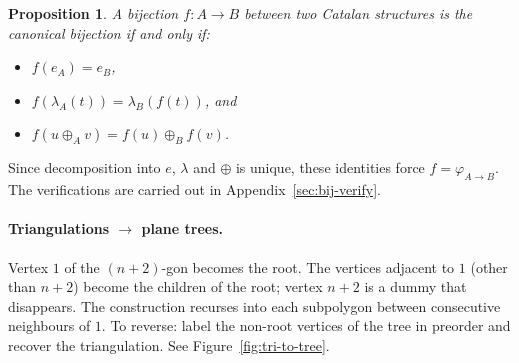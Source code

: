 \documentclass[a4paper,11pt]{article}
\newtheorem{proposition}[theorem]{Proposition}
\theoremstyle{definition}
\begin{document}
\begin{proposition}
A bijection $f : A \to B$ between two Catalan structures
is the canonical bijection if and only if:
\begin{itemize}
\item $f(e_A) = e_B$,
\item $f(\lambda_A(t)) = \lambda_B(f(t))$, and
\item $f(u \oplus_A v) = f(u) \oplus_B f(v)$.
\end{itemize}
\end{proposition}

Since decomposition into $e$, $\lambda$ and $\oplus$ is
unique, these identities force
$f = \varphi_{A \to B}$. The verifications are carried out
in Appendix~\ref{sec:bij-verify}.

\paragraph{Triangulations $\to$ plane trees.}
Vertex $1$ of the $(n{+}2)$-gon becomes the root. The
vertices adjacent to $1$ (other than $n{+}2$) become the
children of the root; vertex $n{+}2$ is a dummy that
disappears. The construction recurses into each subpolygon
between consecutive neighbours of $1$. To reverse: label
the non-root vertices of the tree in preorder and recover
the triangulation. See
Figure~\ref{fig:tri-to-tree}.
\end{document}
